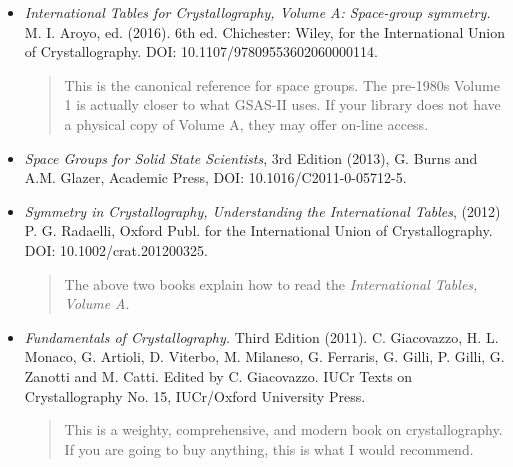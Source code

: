 \begin{itemize}
\item 
\textit{International Tables for Crystallography, Volume A: Space-group symmetry.} M. I. Aroyo, ed. (2016). 6th ed. Chichester: Wiley, for the International Union of Crystallography. DOI:  10.1107/97809553602060000114. 
\begin{quote}
This is the canonical reference for space groups. The pre-1980s Volume 1 is actually closer to what GSAS-II uses. If your library does not have a physical copy of Volume A, they may offer on-line access.
\end{quote}

\item \textit{Space Groups for Solid State Scientists}, 3rd Edition (2013), G. Burns and A.M. Glazer, Academic Press, DOI: 10.1016/C2011-0-05712-5. 
\item
\textit{Symmetry in Crystallography, Understanding the International Tables}, (2012) P. G. Radaelli, Oxford Publ. for the International Union of Crystallography. DOI: 10.1002/crat.201200325.
\begin{quote}
The above two books explain how to read the \textit{International Tables, Volume A}.
\end{quote}

\item 
\textit{Fundamentals of Crystallography.} Third Edition (2011). C. Giacovazzo, H. L. Monaco, G. Artioli, D. Viterbo, M. Milaneso, G. Ferraris, G. Gilli, P. Gilli, G. Zanotti and M. Catti. Edited by C. Giacovazzo. IUCr Texts on Crystallography No. 15, IUCr/Oxford University Press.
\begin{quote}
This is a weighty, comprehensive, and modern book on crystallography. If you are going to buy anything, this is what I would recommend. 
\end{quote}


\end{itemize}
